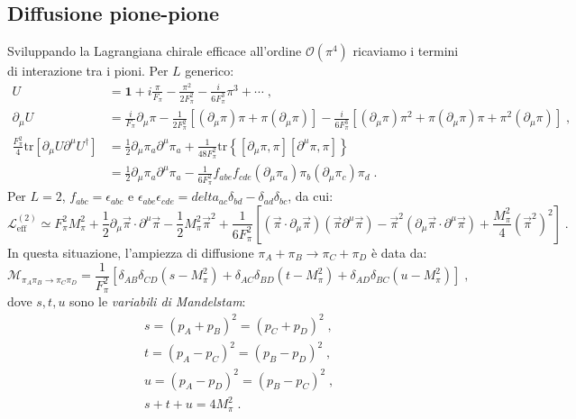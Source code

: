 \documentclass[12pt,a4paper]{article}
\theoremstyle{definition}
\newcommand{\lag}{\mathcal{L}}
\newcommand{\adj}[1]{#1^{\dagger}}
\newcommand{\tr}{\mathrm{tr}}
\numberwithin{equation}{section}
\begin{document}
\subsection{Diffusione pione-pione}
Sviluppando la Lagrangiana chirale efficace all'ordine $\mathcal{O}(\pi^4)$ ricaviamo i termini di interazione tra i pioni. Per $L$ generico:
\begin{align*}
U&=\mathbf{1}+i\frac{\pi}{F_{\pi}}-\frac{\pi^2}{2F_{\pi}^2}-\frac{i}{6F_{\pi}^3}\pi^3+\cdots\;, \\
\partial_{\mu}U&=\frac{i}{F_{\pi}}\partial_{\mu}\pi-\frac{1}{2F_{\pi}^2}\left[(\partial_{\mu}\pi)\pi+\pi(\partial_{\mu}\pi)\right]-\frac{i}{6F_{\pi}^3}\left[(\partial_{\mu}\pi)\pi^2+\pi(\partial_{\mu}\pi)\pi+\pi^2(\partial_{\mu}\pi)\right]\;, \\
\frac{F_{\pi}^2}{4}\tr[\partial_{\mu}U\partial^{\mu}\adj{U}]&=\frac{1}{2}\partial_{\mu}\pi_a\partial^{\mu}\pi_a+\frac{1}{48F_{\pi}^2}\tr\left\{[\partial_{\mu}\pi,\pi][\partial^{\mu}\pi,\pi]\right\} \\
&=\frac{1}{2}\partial_{\mu}\pi_a\partial^{\mu}\pi_a-\frac{1}{6F_{\pi}^2}f_{abe}f_{cde}(\partial_{\mu}\pi_a)\pi_b(\partial_{\mu}\pi_c)\pi_d\;.
\end{align*}
Per $L=2$, $f_{abc}=\epsilon_{abc}$ e $\epsilon_{abe}\epsilon_{cde}=delta_{ac}\delta_{bd}-\delta_{ad}\delta_{bc}$, da cui:
\begin{equation}
\lag_{\mathrm{eff}}^{(2)}\simeq F_{\pi}^2M_{\pi}^2+\frac{1}{2}\partial_{\mu}\vec{\pi}\cdot\partial^{\mu}\vec{\pi}-\frac{1}{2}M_{\pi}^2\vec{\pi}^2+\frac{1}{6F_{\pi}^2}\left[(\vec{\pi}\cdot\partial_{\mu}\vec{\pi})(\vec{\pi}\partial^{\mu}\vec{\pi})-\vec{\pi}^2(\partial_{\mu}\vec{\pi}\cdot\partial^{\mu}\vec{\pi})+\frac{M_{\pi}^2}{4}(\vec{\pi}^2)^2\right]\;.
\end{equation}
In questa situazione, l'ampiezza di diffusione $\pi_A+\pi_B\to \pi_C+\pi_D$ è data da:
\begin{equation}
\mathcal{M}_{\pi_A\pi_B\to\pi_C\pi_D}=\frac{1}{F_{\pi}^2}\left[\delta_{AB}\delta_{CD}(s-M_{\pi}^2)+\delta_{AC}\delta_{BD}(t-M_{\pi}^2)+\delta_{AD}\delta_{BC}(u-M_{\pi}^2)\right]\;,
\end{equation}
dove $s,t,u$ sono le \emph{variabili di Mandelstam}:
\begin{align*}
&s=(p_A+p_B)^2=(p_C+p_D)^2\;, \\
&t=(p_A-p_C)^2=(p_B-p_D)^2\;, \\
&u=(p_A-p_D)^2=(p_B-p_C)^2\;, \\
&s+t+u=4M_{\pi}^2\;.
\end{align*}
\end{document}
